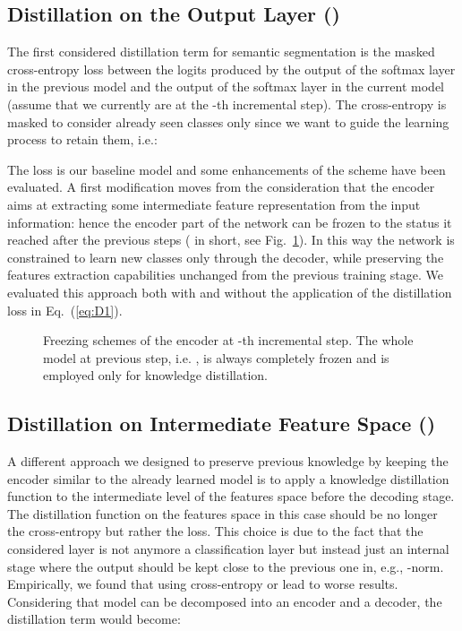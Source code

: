 \documentclass[10pt,twocolumn,letterpaper]{article}
\begin{document}
\subsection{Distillation on the Output Layer ()}


The first considered distillation term  for semantic segmentation is the masked cross-entropy loss between the logits produced by the output of the softmax layer in the previous model  and the output of the softmax layer in the current model  (assume that we  currently are at the -th incremental step). The cross-entropy is masked to consider already seen classes only since we want to guide the learning process to retain them, i.e.:




The loss  is our baseline model and some enhancements of the scheme have been evaluated.
A first modification moves from the consideration that the encoder  aims at extracting some intermediate feature representation from the input information: hence the encoder part of the network can be frozen to the status it reached after the previous steps ( in short, see  Fig.~\ref{fig:encoders}). In this way the network is constrained to learn new classes only through the decoder, while preserving the features extraction capabilities unchanged from the previous training stage. We evaluated this approach both with and without the application of the distillation loss in Eq.~(\ref{eq:D1}). 


\begin{figure}\centering
    \vspace{0.1cm}
\caption{Freezing schemes of the encoder at -th incremental step. The whole model at previous step, i.e. , is always completely frozen and is employed only for knowledge distillation.}\label{fig:encoders}\end{figure}


\subsection{Distillation on Intermediate Feature Space ()}

A different approach we designed to preserve previous knowledge by keeping the encoder similar to the already learned model is to apply a knowledge distillation function to the intermediate level of the features space before the decoding stage. The distillation function on the features space in this case should be no longer the cross-entropy but rather the  loss. This choice is due to the fact that the considered layer is not anymore a classification layer but instead  just an internal stage where the output should be kept close to the previous one in, e.g., -norm.  
Empirically, we found that using cross-entropy or  lead to worse results.
Considering that model  can be decomposed into an encoder  and a decoder, the distillation term would become:
\end{document}
